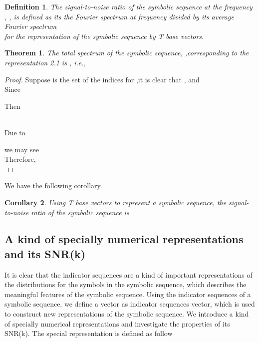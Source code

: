 \documentclass[preprint,authoryear,12pt]{elsarticle}
\newtheorem{definition}{Definition}[section]\newtheorem{theory}{Theory}
\newtheorem{thm}{Theorem}[section]
\newtheorem{cor}[thm]{Corollary}
\begin{document}
\begin{definition} The signal-to-noise ratio of the symbolic sequence at the frequency  , , is defined as its the Fourier spectrum at frequency  divided by its average Fourier spectrum\\

for the representation of the symbolic sequence by T base vectors.
\end{definition}

\begin{thm}
The total spectrum of the symbolic sequence, ,corresponding to the representation 2.1 is , i.e.,

\end{thm}

\begin{proof}
Suppose   is the set of the indices for ,it is clear that ,  and \\
Since

Then

\\
Due to 

we may see\\

 Therefore,\\
 
\end{proof}
We have the following corollary.\\
\begin{cor}\label{3.1}
Using T base vectors to represent a symbolic sequence, the signal-to-noise ratio of the symbolic sequence is

\end{cor}



\subsection{A kind of specially numerical representations and its SNR(k)}
It is clear that the indicator sequences are a kind of important representations of the distributions for the symbols in the symbolic sequence, which describes the meaningful features of the symbolic sequence. Using the indicator sequences of a symbolic sequence, we define a vector  as indicator sequences vector, which is used to construct new representations of the symbolic sequence. We introduce a kind of specially numerical representations and investigate the properties of its SNR(k). The special representation is defined as follow\\
\end{document}
